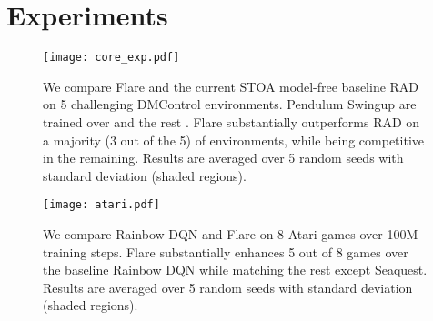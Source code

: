 \documentclass{article} \usepackage{iclr2021_conference,times}
\begin{document}
\section{Experiments}\label{sec:exp}
\vspace{-1mm}
\begin{figure}[t]
\begin{center}
\texttt{[image: core\_exp.pdf]}
\end{center}
\small
\caption{We compare Flare and the current STOA model-free baseline RAD on 5 challenging DMControl environments. Pendulum Swingup are trained over  and the rest . Flare substantially outperforms RAD on a majority (3 out of the 5) of environments, while being competitive in the remaining. 
Results are averaged over 5 random seeds with standard deviation (shaded regions). 
}
\label{fig:core}
\end{figure}
\begin{figure}[h]
\begin{center}
\texttt{[image: atari.pdf]}
\end{center}
\small
\caption{We compare Rainbow DQN and Flare on 8 Atari games over 100M training steps. Flare substantially enhances 5 out of 8 games over the baseline Rainbow DQN while matching the rest except Seaquest. Results are averaged over 5 random seeds with standard deviation (shaded regions).
}
\label{fig:atari}
\end{figure}
\end{document}
